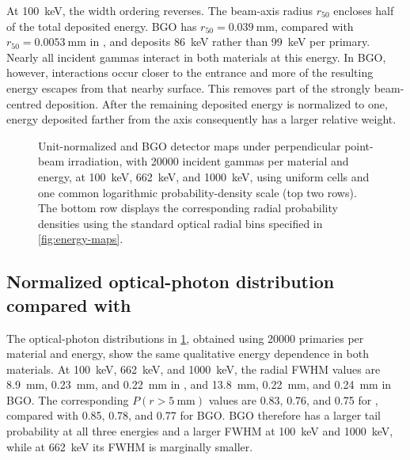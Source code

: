 At \qty{100}{\kilo\electronvolt}, the width ordering reverses. The beam-axis radius $r_{50}$ encloses half of the total deposited energy. BGO has $r_{50}=\qty{0.039}{\milli\metre}$, compared with $r_{50}=\qty{0.0053}{\milli\metre}$ in , and deposits \qty{86}{\kilo\electronvolt} rather than \qty{99}{\kilo\electronvolt} per primary.
Nearly all incident gammas interact in both materials at this energy. In BGO, however, interactions occur closer to the entrance and more of the resulting energy escapes from that nearby surface. This removes part of the strongly beam-centred deposition. After the remaining deposited energy is normalized to one, energy deposited farther from the axis consequently has a larger relative weight.

\begin{figure}[!t]
  \captionsetup{font=small}
  \centering
  \caption{Unit-normalized  and BGO detector maps under perpendicular point-beam irradiation, with \num{20000} incident gammas per material and energy, at \qty{100}{\kilo\electronvolt}, \qty{662}{\kilo\electronvolt}, and \qty{1000}{\kilo\electronvolt}, using uniform  cells and one common logarithmic probability-density scale (top two rows). The bottom row displays the corresponding radial probability densities using the standard optical radial bins specified in \cref{fig:energy-maps}.}
  \label{fig:material-optical-shapes}
\end{figure}

\subsection{Normalized optical-photon distribution compared with }

The optical-photon distributions in \cref{fig:material-optical-shapes}, obtained using \num{20000} primaries per material and energy, show the same qualitative energy dependence in both materials. At \qty{100}{\kilo\electronvolt}, \qty{662}{\kilo\electronvolt}, and \qty{1000}{\kilo\electronvolt}, the radial FWHM values are \qty{8.9}{\milli\metre}, \qty{0.23}{\milli\metre}, and \qty{0.22}{\milli\metre} in , and \qty{13.8}{\milli\metre}, \qty{0.22}{\milli\metre}, and \qty{0.24}{\milli\metre} in BGO. The corresponding $P(r>\qty{5}{\milli\metre})$ values are 0.83, 0.76, and 0.75 for , compared with 0.85, 0.78, and 0.77 for BGO. BGO therefore has a larger tail probability at all three energies and a larger FWHM at \qty{100}{\kilo\electronvolt} and \qty{1000}{\kilo\electronvolt}, while at \qty{662}{\kilo\electronvolt} its FWHM is marginally smaller.

